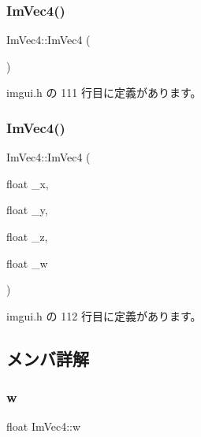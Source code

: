 \subsubsection{\texorpdfstring{Im\+Vec4()}{ImVec4()}\hspace{0.1cm}{\footnotesize\ttfamily [1/2]}}
{\footnotesize\ttfamily Im\+Vec4\+::\+Im\+Vec4 (\begin{DoxyParamCaption}{ }\end{DoxyParamCaption})\hspace{0.3cm}{\ttfamily [inline]}}



 imgui.\+h の 111 行目に定義があります。

\mbox{\label{struct_im_vec4_af9e535f36b0fc7b9af0f60951fb4ffe4}} 
\subsubsection{\texorpdfstring{Im\+Vec4()}{ImVec4()}\hspace{0.1cm}{\footnotesize\ttfamily [2/2]}}
{\footnotesize\ttfamily Im\+Vec4\+::\+Im\+Vec4 (\begin{DoxyParamCaption}\item[{float}]{\+\_\+x,  }\item[{float}]{\+\_\+y,  }\item[{float}]{\+\_\+z,  }\item[{float}]{\+\_\+w }\end{DoxyParamCaption})\hspace{0.3cm}{\ttfamily [inline]}}



 imgui.\+h の 112 行目に定義があります。



\subsection{メンバ詳解}
\mbox{\label{struct_im_vec4_afeed5acd9f0d2043175f4da229d12a38}} 
\subsubsection{\texorpdfstring{w}{w}}
{\footnotesize\ttfamily float Im\+Vec4\+::w}



